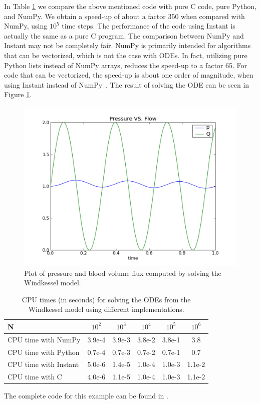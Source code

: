 In Table \ref{wilbers:fig:speed-up} we compare the above mentioned
code with pure C code, pure Python, and NumPy.  We obtain a speed-up
of about a factor $350$ when compared with NumPy, using $10^5$ time
steps. The performance of the code using Instant is actually the same
as a pure C program.  The comparison between NumPy and Instant may not
be completely fair. NumPy is primarily intended for algorithms that
can be vectorized, which is not the case with ODEs. In fact, utilizing
pure Python lists instead of NumPy arrays, reduces the speed-up to a
factor 65. For code that can be vectorized, the speed-up is about one
order of magnitude, when using Instant instead of
NumPy~\citep{WilbersLangtangenOdegaard2009}. The result of solving the
ODE can be seen in Figure
\ref{wilbers:fig:fig1}.

\begin{figure}
  \centering
  \includegraphics[width=\largefig]{chapters/wilbers/pdf/pressure_plot.pdf}
  \caption{Plot of pressure and blood volume flux computed by solving the Windkessel model.}
  \label{wilbers:fig:fig1}
\end{figure}

\begin{table}
  \centering
  \begin{tabular}{lccccc}
    \toprule
    N                     & $10^2$     & $10^3$ & $10^4$ &  $10^5$ &  $10^6$ \\
    \midrule
    CPU time with NumPy   & 3.9e-4  & 3.9e-3 & 3.8e-2 & 3.8e-1 & 3.8     \\
    CPU time with Python  & 0.7e-4  & 0.7e-3 & 0.7e-2 & 0.7e-1 & 0.7     \\
    CPU time with Instant & 5.0e-6  & 1.4e-5 & 1.0e-4 & 1.0e-3 & 1.1e-2  \\
    CPU time with C       & 4.0e-6  & 1.1e-5 & 1.0e-4 & 1.0e-3 & 1.1e-2  \\
    \bottomrule
  \end{tabular}
  \caption{CPU times (in seconds) for solving the ODEs from the  Windkessel model using different implementations.}
  \label{wilbers:fig:speed-up}
\end{table}
The complete code for this example can be found in .

